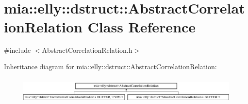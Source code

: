 \hypertarget{classmia_1_1elly_1_1dstruct_1_1_abstract_correlation_relation}{\section{mia\-:\-:elly\-:\-:dstruct\-:\-:Abstract\-Correlation\-Relation Class Reference}
\label{classmia_1_1elly_1_1dstruct_1_1_abstract_correlation_relation}
}


{\ttfamily \#include $<$Abstract\-Correlation\-Relation.\-h$>$}

Inheritance diagram for mia\-:\-:elly\-:\-:dstruct\-:\-:Abstract\-Correlation\-Relation\-:\begin{figure}[H]
\begin{center}
\leavevmode
\includegraphics[height=1.396509cm]{classmia_1_1elly_1_1dstruct_1_1_abstract_correlation_relation}
\end{center}
\end{figure}
